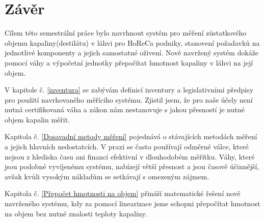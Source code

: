 \chapter*{Závěr}
{}

%
%
%



Cílem této semestrální práce bylo navrhnout systém pro měření zůstatkového objemu kapaliny(destilátu) v láhvi pro HoReCa podniky, stanovení požadavků na jednotlivé komponenty a jejich samostatné oživení. Nově navržený systém dokáže pomocí váhy a výpočetní jednotky přepočítat hmotnost kapaliny v láhvi na její objem.

V kapitole č. \ref{inventura} se zabývám definicí inventury a legislativními předpisy pro použití navrhovaného měříciho systému. Zjistil jsem, že pro naše účely není nutná certifikovaná váha a zákon nám nestanovuje s jakou přesností je nutné objem kapalin měřit. 

Kapitola č. \ref{Dosavadní metody měření} pojednává o stávajících metodách měření a jejich hlavních nedostatcích. V praxi se často používají odměrné válce, které nejsou z hlediska času ani financí efektivní v dlouhodobém měřítku. Váhy, které jsou podobné vyvíjenému systému, nabízejí větší přesnost a jsou časově účinnější, avšak kvůli vysokým nákladům se setkávají s omezeným zájmem.

Kapitola č. \ref{Přepočet hmotnosti na objem} přináší matematické řešení nově navrženého systému, kdy za pomocí linearizace jsme schopni přepočítat hmotnost na objem bez nutné znalosti teploty kapaliny.  %

